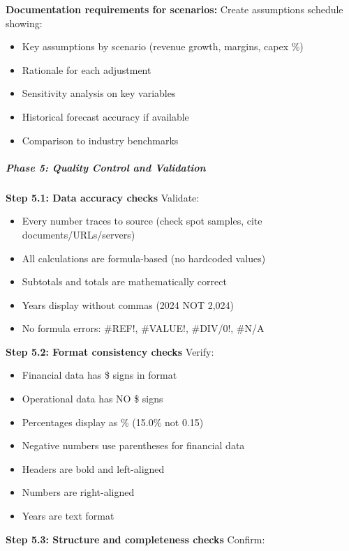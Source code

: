 \documentclass[11pt]{article}
\begin{document}
\textbf{Documentation requirements for scenarios:} Create assumptions schedule showing:

\begin{itemize}[leftmargin=*,itemsep=2pt,topsep=2pt]
\item {} Key assumptions by scenario (revenue growth, margins, capex \%)
\item {} Rationale for each adjustment
\item {} Sensitivity analysis on key variables
\item {} Historical forecast accuracy if available
\item {} Comparison to industry benchmarks
\end{itemize}

\subparagraph{Phase 5: Quality Control and Validation}\mbox{}\par

\textbf{Step 5.1: Data accuracy checks} Validate:

\begin{itemize}[leftmargin=*,itemsep=2pt,topsep=2pt]
\item {} Every number traces to source (check spot samples, cite documents/URLs/servers)
\item {} All calculations are formula-based (no hardcoded values)
\item {} Subtotals and totals are mathematically correct
\item {} Years display without commas (2024 NOT 2,024)
\item {} No formula errors: \#REF!, \#VALUE!, \#DIV/0!, \#N/A
\end{itemize}

\textbf{Step 5.2: Format consistency checks} Verify:

\begin{itemize}[leftmargin=*,itemsep=2pt,topsep=2pt]
\item {} Financial data has \$ signs in format
\item {} Operational data has NO \$ signs
\item {} Percentages display as \% (15.0\% not 0.15)
\item {} Negative numbers use parentheses for financial data
\item {} Headers are bold and left-aligned
\item {} Numbers are right-aligned
\item {} Years are text format
\end{itemize}

\textbf{Step 5.3: Structure and completeness checks} Confirm:
\end{document}
